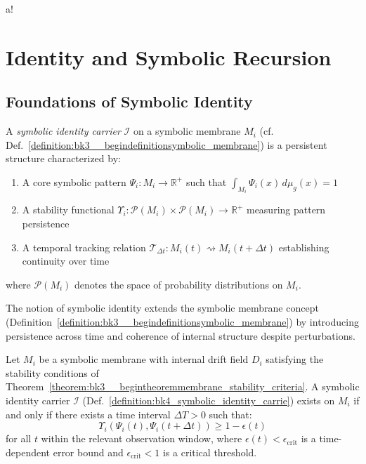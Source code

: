 a!\section{Identity and Symbolic Recursion}
\label{sec:bk4_identity_and_symbolic_recursion}
\subsection{Foundations of Symbolic Identity} \label{subsec:bk4_foundations_symbolic_identity}
\begin{definition}
\label{definition:bk4_symbolic_identity_carrie}
A \emph{symbolic identity carrier} $\mathcal{I}$ on a symbolic membrane $M_i$ (cf. Def.~\ref{definition:bk3__begindefinitionsymbolic_membrane}) is a persistent structure characterized by:
\begin{enumerate}
    \item A core symbolic pattern $\Psi_i : M_i \to \mathbb{R}^+$ such that $\int_{M_i} \Psi_i(x)\, d\mu_g(x) = 1$
    \item A stability functional $\Upsilon_i : \mathcal{P}(M_i) \times \mathcal{P}(M_i) \to \mathbb{R}^+$ measuring pattern persistence
    \item A temporal tracking relation $\mathcal{T}_{\Delta t} : M_i(t) \rightsquigarrow M_i(t+\Delta t)$ establishing continuity over time
\end{enumerate}
where $\mathcal{P}(M_i)$ denotes the space of probability distributions on $M_i$.
\end{definition}
The notion of symbolic identity extends the symbolic membrane concept (Definition~\ref{definition:bk3__begindefinitionsymbolic_membrane}) by introducing persistence across time and coherence of internal structure despite perturbations.
\begin{theorem}
\label{theorem:bk4_existence_of_symbolic_ident}
Let $M_i$ be a symbolic membrane with internal drift field $D_i$ satisfying the stability conditions of Theorem~\ref{theorem:bk3__begintheoremmembrane_stability_criteria}. A symbolic identity carrier $\mathcal{I}$ (Def.~\ref{definition:bk4_symbolic_identity_carrie}) exists on $M_i$ if and only if there exists a time interval $\Delta T > 0$ such that:
\begin{equation} \label{eq:bk4_mutual_info_expansion_entropy}
\Upsilon_i(\Psi_i(t), \Psi_i(t+\Delta t)) \geq 1 - \epsilon(t)
\end{equation}
for all $t$ within the relevant observation window, where $\epsilon(t) < \epsilon_{\text{crit}}$ is a time-dependent error bound and $\epsilon_{\text{crit}} < 1$ is a critical threshold.
\end{theorem}
